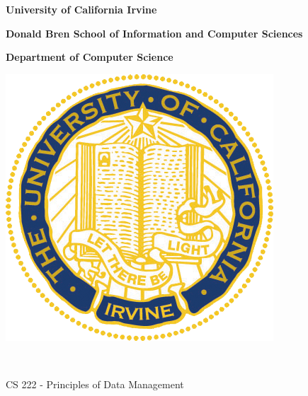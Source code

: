 \documentclass[a4paper,12pt]{article}
\begin{document}
\begin{titlepage}

\noindent
\begin{minipage}{0.8\textwidth}
\begin{flushleft}
\noindent
\begin{large}
\textbf{University of California Irvine}
\end{large}

\noindent
\begin{small}
\textbf{Donald Bren School of Information and Computer Sciences}\\
\end{small}

\noindent
\begin{small}
\textbf{Department of Computer Science}\\
\end{small}
\end{flushleft}
\end{minipage}
\begin{minipage}{0.2\textwidth}
\begin{flushright}
\includegraphics[scale=0.25]{Figures/uci_logo.png}
\end{flushright}
\end{minipage}\\



\begin{center}
\begin{large}
CS 222 - Principles of Data Management
\end{large}
\end{center}


\end{titlepage}
\end{document}
